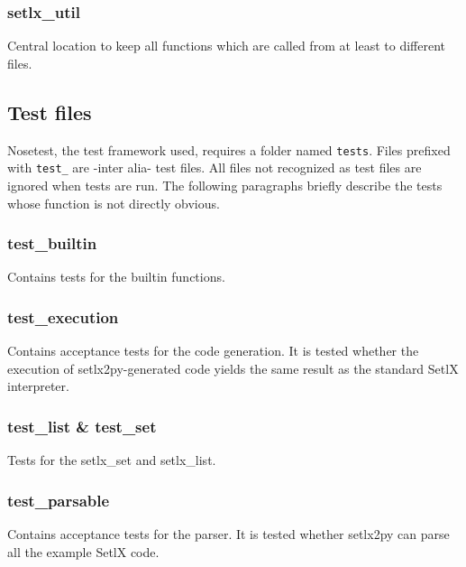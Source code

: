 %
\subsubsection{setlx\_util}

Central location to keep all functions which are called from at least to different files.

%
%
\clearpage
\subsection{Test files}

Nosetest, the test framework used, requires a folder named \texttt{tests}. Files prefixed with \texttt{test\_} are -inter alia- test files. All files not recognized as test files are ignored when tests are run. The following paragraphs briefly describe the tests whose function is not directly obvious.

%
\subsubsection{test\_builtin}

Contains tests for the builtin functions.

%
\subsubsection{test\_execution}

Contains acceptance tests for the code generation. It is tested whether the execution of setlx2py-generated code yields the same result as the standard SetlX interpreter.
%
\subsubsection{test\_list \& test\_set}

Tests for the setlx\_set and setlx_list.

%
\subsubsection{test\_parsable}

Contains acceptance tests for the parser. It is tested whether setlx2py can parse all the example SetlX code.
